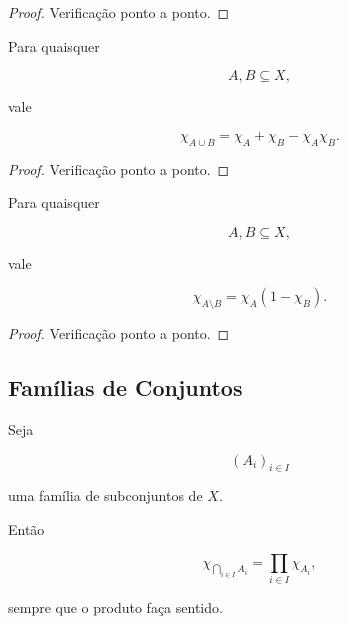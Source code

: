 \documentclass[../../main]{subfiles}
\begin{document}
\begin{proof}

	Verificação ponto a ponto.

\end{proof}

\begin{prop}[União]
	\label{prop:matematica:funcoes:caracteristicas:uniao}

	Para quaisquer

	\[
		A,B\subseteq X,
	\]

	vale

	\[
		\chi_{A\cup B}
		=
		\chi_A+\chi_B-\chi_A\chi_B.
	\]

\end{prop}

\begin{proof}

	Verificação ponto a ponto.

\end{proof}

\begin{prop}[Diferença]
	\label{prop:matematica:funcoes:caracteristicas:diferenca}

	Para quaisquer

	\[
		A,B\subseteq X,
	\]

	vale

	\[
		\chi_{A\setminus B}
		=
		\chi_A(1-\chi_B).
	\]

\end{prop}

\begin{proof}

	Verificação ponto a ponto.

\end{proof}

\subsection{Famílias de Conjuntos}

\begin{prop}
	\label{prop:matematica:funcoes:caracteristicas:intersecao-familia}

	Seja

	\[
		(A_i)_{i\in I}
	\]

	uma família de subconjuntos de \(X\).

	Então

	\[
		\chi_{\bigcap_{i\in I}A_i}
		=
		\prod_{i\in I}\chi_{A_i},
	\]

	sempre que o produto faça sentido.

\end{prop}
\end{document}
